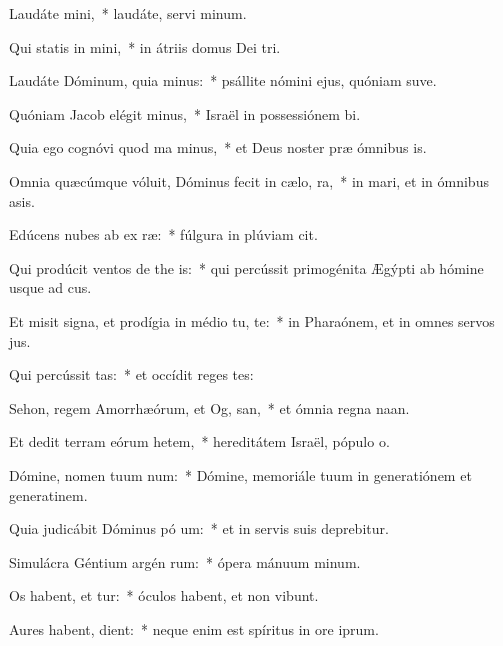 \item Laudáte  mini,~* laudáte, servi minum.
\item Qui statis in  mini,~* in átriis domus Dei tri.
\item Laudáte Dóminum, quia  minus:~* psállite nómini ejus, quóniam suve.
\item Quóniam Jacob elégit  minus,~* Israël in possessiónem bi.
\item Quia ego cognóvi quod ma  minus,~* et Deus noster præ ómnibus is.
\item Omnia quæcúmque vóluit, Dóminus fecit in cælo,   ra,~* in mari, et in ómnibus asis.
\item Edúcens nubes ab ex ræ:~* fúlgura in plúviam cit.
\item Qui prodúcit ventos de the is:~* qui percússit primogénita Ægýpti ab hómine usque ad cus.
\item Et misit signa, et prodígia in médio tu, te:~* in Pharaónem, et in omnes servos jus.
\item Qui percússit  tas:~* et occídit reges tes:
\item Sehon, regem Amorrhæórum, et Og,  san,~* et ómnia regna naan.
\item Et dedit terram eórum hetem,~* hereditátem Israël, pópulo o.
\item Dómine, nomen tuum  num:~* Dómine, memoriále tuum in generatiónem et generatinem.
\item Quia judicábit Dóminus pó um:~* et in servis suis deprebitur.
\item Simulácra Géntium argén  rum:~* ópera mánuum minum.
\item Os habent, et  tur:~* óculos habent, et non vibunt.
\item Aures habent,   dient:~* neque enim est spíritus in ore iprum.
